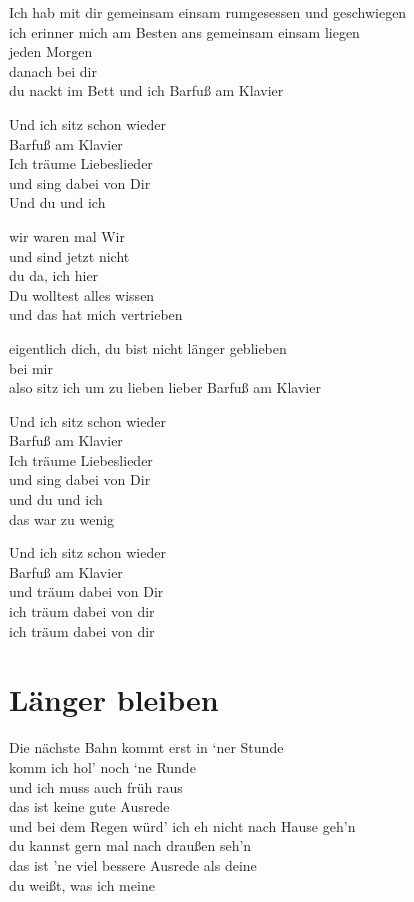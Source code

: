 \documentclass[]{book}
\begin{document}
Ich hab mit dir gemeinsam einsam rumgesessen und geschwiegen\\
ich erinner mich am Besten ans gemeinsam einsam liegen\\
jeden Morgen\\
danach bei dir\\
du nackt im Bett und ich Barfuß am Klavier

Und ich sitz schon wieder\\
Barfuß am Klavier\\
Ich träume Liebeslieder\\
und sing dabei von Dir\\
Und du und ich

wir waren mal Wir\\
und sind jetzt nicht\\
du da, ich hier\\
Du wolltest alles wissen\\
und das hat mich vertrieben

eigentlich dich, du bist nicht länger geblieben\\
bei mir\\
also sitz ich um zu lieben lieber Barfuß am Klavier

Und ich sitz schon wieder\\
Barfuß am Klavier\\
Ich träume Liebeslieder\\
und sing dabei von Dir\\
und du und ich\\
das war zu wenig

Und ich sitz schon wieder\\
Barfuß am Klavier\\
und träum dabei von Dir\\
ich träum dabei von dir\\
ich träum dabei von dir

\hypertarget{langer-bleiben-2}{%
\section{Länger bleiben}\label{langer-bleiben-2}}

Die nächste Bahn kommt erst in `ner Stunde\\
komm ich hol' noch `ne Runde\\
und ich muss auch früh raus\\
das ist keine gute Ausrede\\
und bei dem Regen würd' ich eh nicht nach Hause geh'n\\
du kannst gern mal nach draußen seh'n\\
das ist 'ne viel bessere Ausrede als deine\\
du weißt, was ich meine
\end{document}
